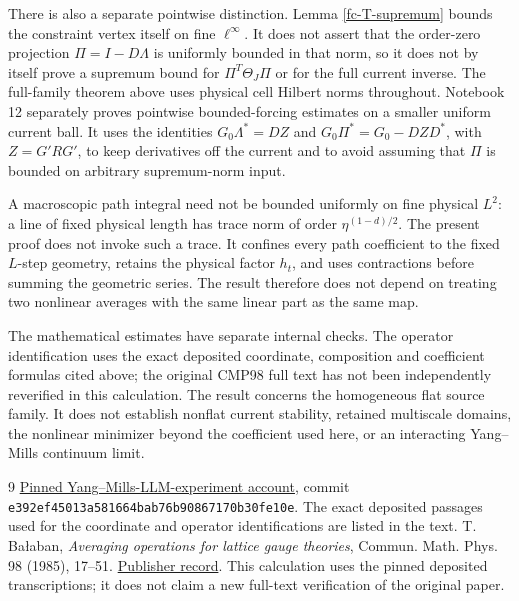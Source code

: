 \documentclass[11pt]{article}
\theoremstyle{remark}
\begin{document}
There is also a separate pointwise distinction. Lemma
\ref{fc-T-supremum} bounds the constraint vertex itself on fine
$\ell^\infty$. It does not assert that the order-zero projection
$\Pi=I-D\Lambda$ is uniformly bounded in that norm, so it does not
by itself prove a supremum bound for $\Pi^T\Theta_J\Pi$ or for the
full current inverse. The full-family theorem above uses physical
cell Hilbert norms throughout.
Notebook 12 separately proves pointwise bounded-forcing estimates
on a smaller uniform current ball. It uses the identities
$G_0\Lambda^*=DZ$ and $G_0\Pi^*=G_0-DZD^*$, with
$Z=G'RG'$, to keep derivatives off the current and to avoid
assuming that $\Pi$ is bounded on arbitrary supremum-norm input.

A macroscopic path integral need not be bounded uniformly on fine
physical $L^2$: a line of fixed physical length has trace norm of
order $\eta^{(1-d)/2}$. The present proof does not invoke such a
trace. It confines every path coefficient to the fixed $L$-step
geometry, retains the physical factor $h_t$, and uses contractions
before summing the geometric series. The result therefore does not
depend on treating two nonlinear averages with the same linear
part as the same map.

The mathematical estimates have separate internal checks. The
operator identification uses the exact deposited coordinate,
composition and coefficient formulas cited above; the original
CMP98 full text has not been independently reverified in this
calculation. The result concerns the homogeneous flat source
family. It does not establish nonflat current stability, retained
multiscale domains, the nonlinear minimizer beyond the coefficient
used here, or an interacting Yang--Mills continuum limit.

\begin{thebibliography}{9}
\href{https://github.com/ethanwsussman/Yang--Mills-LLM-experiment/tree/e392ef45013a581664bab76b90867170b30fe10e}
{Pinned Yang--Mills-LLM-experiment account}, commit
\texttt{e392ef4501\allowbreak 3a581664ba\allowbreak b76b908671\allowbreak 70b30fe10e}.
The exact deposited passages used for the coordinate and operator
identifications are listed in the text.
T. Ba\l aban, \emph{Averaging operations for lattice gauge theories},
Commun. Math. Phys. 98 (1985), 17--51.
\href{https://doi.org/10.1007/BF01211042}{Publisher record}.
This calculation uses the pinned deposited transcriptions; it does not
claim a new full-text verification of the original paper.
\end{thebibliography}
\end{document}
